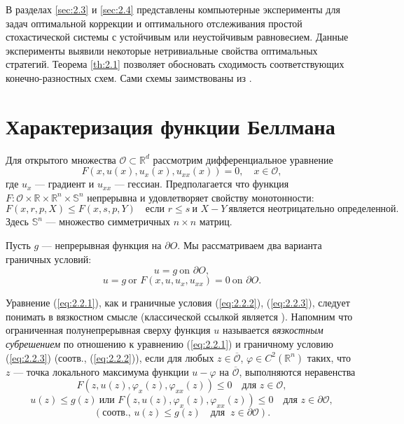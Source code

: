 В разделах \ref{sec:2.3} и \ref{sec:2.4} представлены компьютерные эксперименты для задач оптимальной коррекции и оптимального отслеживания простой стохастической системы с устойчивым или неустойчивым равновесием. Данные эксперименты выявили некоторые нетривиальные свойства оптимальных стратегий. Теорема \ref{th:2.1} позволяет обосновать сходимость соответствующих конечно-разностных схем. Сами схемы заимствованы из \cite{Obe06}.

\section{Характеризация функции Беллмана} \label{sec:2.2}
Для открытого множества $\mathcal O\subset\mathbb R^d$ рассмотрим дифференциальное уравнение
\begin{equation} \label{eq:2.2.1}
F(x,u(x),u_x(x),u_{xx}(x))=0,\quad x\in\mathcal O,
\end{equation}
где $u_x$ --- градиент и $u_{xx}$ --- гессиан. Предполагается что функция
$F:\mathcal O\times\mathbb R\times\mathbb R^n\times\mathbb S^n$ непрерывна и удовлетворяет свойству монотонности:
$$ F(x,r,p,X)\le F(x,s,p,Y) \quad \textrm{если } r\le s\ \textrm{и } X-Y\ \textrm{является неотрицательно определенной}.$$
Здесь $\mathbb S^n$ --- множество симметричных $n\times n$ матриц.

Пусть $g$ --- непрерывная функция на $\partial O$. Мы рассматриваем два варианта граничных условий:
\begin{equation} \label{eq:2.2.2}
u=g\ \textrm{on } \partial O,
\end{equation}
\begin{equation} \label{eq:2.2.3}
u=g\ \textrm{or } F(x,u,u_x,u_{xx})=0\ \textrm{on } \partial O.
\end{equation}

Уравнение (\ref{eq:2.2.1}), как и граничные условия (\ref{eq:2.2.2}), (\ref{eq:2.2.3}), следует понимать в вязкостном смысле (классической ссылкой является \cite{CraIshLio92}). Напомним что ограниченная полунепрерывная сверху функция $u$ называется \emph{вязкостным субрешением} по отношению к уравнению (\ref{eq:2.2.1}) и граничному условию (\ref{eq:2.2.3}) (соотв., (\ref{eq:2.2.2})), если для любых $z\in\overline{\mathcal O}$, $\varphi\in C^2(\mathbb R^n)$ таких, что $z$ --- точка локального максимума функции $u-\varphi$ на $\overline{\mathcal O}$, выполняются неравенства
$$F(z,u(z),\varphi_x(z),\varphi_{xx}(z))\le 0\quad \textrm{для } z\in\mathcal O,$$
$$ u(z)\le g(z)\ \textrm{или } F(z,u(z),\varphi_x(z),\varphi_{xx}(z))\le 0\quad \textrm{для } z\in\partial\mathcal O,$$
$$ (\textrm{соотв., } u(z)\le g(z)\quad \textrm{для }\ z\in\partial\mathcal O).$$

